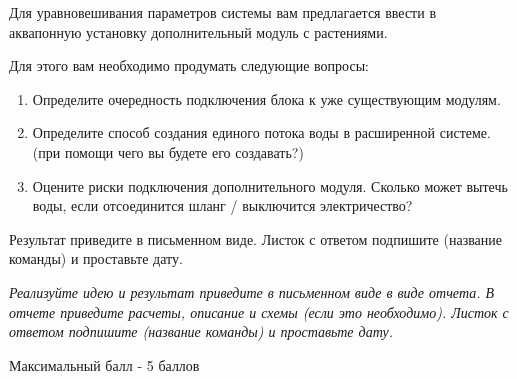 
Для уравновешивания параметров системы вам предлагается ввести в аквапонную установку дополнительный модуль с растениями. 

Для этого вам необходимо продумать следующие вопросы:
\begin{enumerate}
    \item Определите очередность подключения блока к уже существующим модулям.
    \item Определите способ создания единого потока воды в расширенной системе. (при помощи чего вы будете его создавать?)
    \item Оцените риски подключения дополнительного модуля. Сколько может вытечь воды, если отсоединится шланг / выключится электричество?
\end{enumerate}
  
Результат приведите в письменном виде. Листок с ответом подпишите (название команды) и проставьте дату.

\textit{Реализуйте идею и результат приведите в письменном виде в виде отчета. В отчете приведите расчеты, описание и схемы (если это необходимо). Листок с ответом подпишите (название команды) и проставьте дату.}

Максимальный балл - 5 баллов

\markSection

